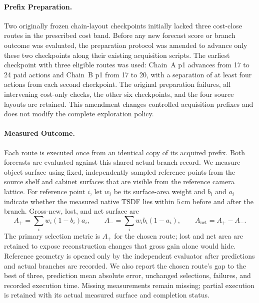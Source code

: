 \paragraph{Prefix Preparation.}
Two originally frozen chain-layout checkpoints initially lacked three cost-close routes in the prescribed cost band. Before any new forecast score or branch outcome was evaluated, the preparation protocol was amended to advance only these two checkpoints along their existing acquisition scripts. The earliest checkpoint with three eligible routes was used: Chain~A p1 advances from 17 to 24 paid actions and Chain~B p1 from 17 to 20, with a separation of at least four actions from each second checkpoint. The original preparation failures, all intervening cost-only checks, the other six checkpoints, and the four source layouts are retained. This amendment changes controlled acquisition prefixes and does not modify the complete exploration policy.

\paragraph{Measured Outcome.}
Each route is executed once from an identical copy of its acquired prefix. Both forecasts are evaluated against this shared actual branch record. We measure object surface using fixed, independently sampled reference points from the source shelf and cabinet surfaces that are visible from the reference camera lattice. For reference point $i$, let $w_i$ be its surface-area weight and $b_i$ and $a_i$ indicate whether the measured native TSDF lies within $5\,$cm before and after the branch. Gross-new, lost, and net surface are
\begin{equation}
 A_{+}=\sum_i w_i(1-b_i)a_i,\qquad
 A_{-}=\sum_i w_i b_i(1-a_i),\qquad
 A_{\mathrm{net}}=A_{+}-A_{-}.
\end{equation}
The primary selection metric is $A_{+}$ for the chosen route; lost and net area are retained to expose reconstruction changes that gross gain alone would hide. Reference geometry is opened only by the independent evaluator after predictions and actual branches are recorded. We also report the chosen route's gap to the best of three, prediction mean absolute error, unchanged selections, failures, and recorded execution time. Missing measurements remain missing; partial execution is retained with its actual measured surface and completion status.

